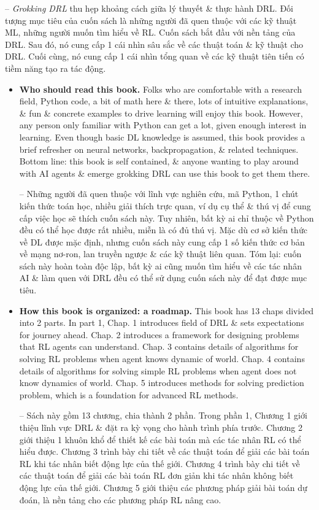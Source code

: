 \documentclass{article}
\begin{document}
\begin{itemize}
    -- {\it Grokking DRL} thu hẹp khoảng cách giữa lý thuyết \& thực hành DRL. Đối tượng mục tiêu của cuốn sách là những người đã quen thuộc với các kỹ thuật ML, những người muốn tìm hiểu về RL. Cuốn sách bắt đầu với nền tảng của DRL. Sau đó, nó cung cấp 1 cái nhìn sâu sắc về các thuật toán \& kỹ thuật cho DRL. Cuối cùng, nó cung cấp 1 cái nhìn tổng quan về các kỹ thuật tiên tiến có tiềm năng tạo ra tác động.
    \begin{itemize}
        \item {\bf Who should read this book.} Folks who are comfortable with a research field, Python code, a bit of math here \& there, lots of intuitive explanations, \& fun \& concrete examples to drive learning will enjoy this book. However, any person only familiar with Python can get a lot, given enough interest in learning. Even though basic DL knowledge is assumed, this book provides a brief refresher on neural networks, backpropagation, \& related techniques. Bottom line: this book is self contained, \& anyone wanting to play around with AI agents \& emerge grokking DRL can use this book to get them there.

        -- Những người đã quen thuộc với lĩnh vực nghiên cứu, mã Python, 1 chút kiến thức toán học, nhiều giải thích trực quan, ví dụ cụ thể \& thú vị để cung cấp việc học sẽ thích cuốn sách này. Tuy nhiên, bất kỳ ai chỉ thuộc về Python đều có thể học được rất nhiều, miễn là có đủ thú vị. Mặc dù cơ sở kiến thức về DL được mặc định, nhưng cuốn sách này cung cấp 1 số kiến thức cơ bản về mạng nơ-ron, lan truyền ngược \& các kỹ thuật liên quan. Tóm lại: cuốn sách này hoàn toàn độc lập, bất kỳ ai cũng muốn tìm hiểu về các tác nhân AI \& làm quen với DRL đều có thể sử dụng cuốn sách này để đạt được mục tiêu.
        \item {\bf How this book is organized: a roadmap.} This book has 13 chaps divided into 2 parts. In part 1, Chap. 1 introduces field of DRL \& sets expectations for journey ahead. Chap. 2 introduces a framework for designing problems that RL agents can understand. Chap. 3 contains details of algorithms for solving RL problems when agent knows dynamic of world. Chap. 4 contains details of algorithms for solving simple RL problems when agent does not know dynamics of world. Chap. 5 introduces methods for solving prediction problem, which is a foundation for advanced RL methods.

        -- Sách này gồm 13 chương, chia thành 2 phần. Trong phần 1, Chương 1 giới thiệu lĩnh vực DRL \& đặt ra kỳ vọng cho hành trình phía trước. Chương 2 giới thiệu 1 khuôn khổ để thiết kế các bài toán mà các tác nhân RL có thể hiểu được. Chương 3 trình bày chi tiết về các thuật toán để giải các bài toán RL khi tác nhân biết động lực của thế giới. Chương 4 trình bày chi tiết về các thuật toán để giải các bài toán RL đơn giản khi tác nhân không biết động lực của thế giới. Chương 5 giới thiệu các phương pháp giải bài toán dự đoán, là nền tảng cho các phương pháp RL nâng cao.


\end{itemize}
\end{itemize}
\end{document}
